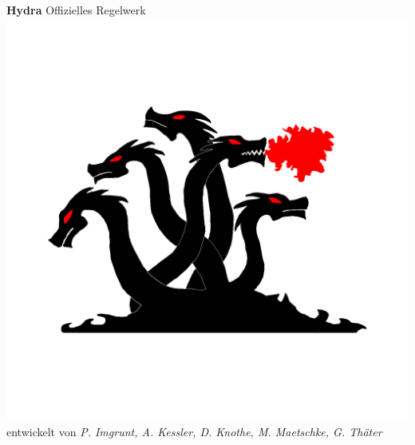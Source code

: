 \documentclass[11pt]{article}
\begin{document}

\begin{titlepage}
    \centering
    \vfill
    \Huge\textbf{Hydra}
    \vskip0.5cm
    \Large Offizielles Regelwerk
    \vfill
    \includegraphics[width=\textwidth]{Hydra.png}
    \vfill
    \large entwickelt von
    \vskip0.2cm
    \textit{P. Imgrunt, A. Kessler, D. Knothe, M. Maetschke, G. Thäter} \\
    \vfill
\end{titlepage}

\end{document}

